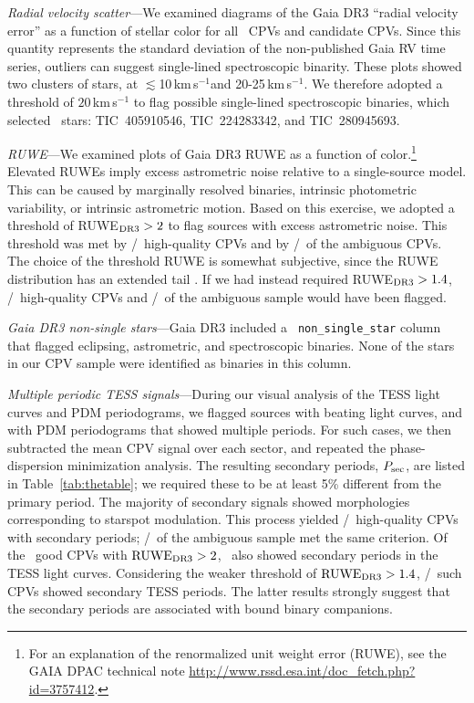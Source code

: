\documentclass[11pt,twocolumn,tighten]{aastex63}
\newcommand{\kms}{{km\,s$^{-1}$}}
\begin{document}
{\it Radial velocity scatter}---We examined diagrams of the Gaia DR3
``radial velocity error'' as a function of stellar color for all
\ncqvsnodebunked\ CPVs and candidate CPVs.  Since this quantity
represents the standard deviation of the non-published Gaia RV time
series, outliers can suggest single-lined spectroscopic binarity.  These plots showed two
clusters of stars, at $\lesssim$10\,\kms and
20-25\,\kms.  We therefore adopted a threshold of $20$\,km\,s$^{-1}$
to flag possible single-lined spectroscopic binaries, which selected
\nrvscatterflag\ stars: TIC~405910546, TIC~224283342, and
TIC~280945693.

{\it RUWE}---We examined plots of Gaia DR3 RUWE as a function of
color.\footnote{For an explanation of the renormalized unit weight
error (RUWE), see the GAIA DPAC technical note
\url{http://www.rssd.esa.int/doc_fetch.php?  id=3757412}.}  Elevated
RUWEs imply excess astrometric noise relative to a single-source
model.  This can be caused by marginally resolved binaries,  intrinsic
photometric variability, or intrinsic astrometric motion.  Based on this exercise, we
adopted a threshold of RUWE$_{\rm DR3}>2$ to flag
sources with excess astrometric noise.  This threshold was met by
\ngoodhighruwe/\ngoods\ high-quality CPVs and by
\nmaybehighruwe/\nmaybes\ of the ambiguous CPVs.  The choice of the
threshold RUWE is somewhat subjective, since the RUWE distribution has
an extended tail \citep[e.g.][]{2022MNRAS.513.5270P}.  If we had
instead required RUWE$_{\rm DR3}>1.4$, \ngoodweakruwe/\ngoods\
high-quality CPVs and \nmaybeweakruwe/\nmaybes\ of the ambiguous
sample would have been flagged.

{\it Gaia DR3 non-single stars}---Gaia DR3 included a {\tt
non\_single\_star} column that flagged eclipsing, astrometric, and
spectroscopic binaries.  None of the stars in our CPV sample were
identified as \deleted{possible }binaries in this column.

{\it Multiple periodic TESS signals}---During our visual analysis of
the TESS light curves and PDM periodograms, we flagged sources with
beating light curves, and with PDM periodograms that showed multiple
periods.  For such cases, we then subtracted the mean CPV signal over
each sector, and repeated the phase-dispersion minimization analysis.
The resulting secondary periods, $P_{\rm sec}$, are listed in
Table~\ref{tab:thetable}; we required these to be at least 5\%
different from the primary period.  The majority of secondary signals
showed morphologies corresponding to starspot modulation.  This
process yielded \ngoodmultperiodflag/\ngoods\ high-quality CPVs with
secondary periods; \nmaybemultperiodflag/\nmaybes\ of the ambiguous
sample met the same criterion.  Of the \ngoodhighruwe\ good CPVs with
${\rm RUWE}_{\rm DR3}> 2$, \ngoodruweandmultperiod\ also showed
secondary periods in the TESS light curves.  Considering the weaker
threshold of ${\rm RUWE}_{\rm DR3}> 1.4$,
\ngoodweakruweandmultperiod/\ngoodweakruwe\ such CPVs showed secondary
TESS periods.  The latter results strongly suggest that the secondary
periods are associated with bound binary companions.
\end{document}
